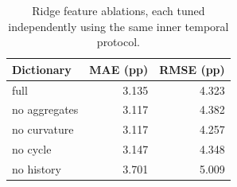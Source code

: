 \begin{table}[H]
\centering
\small
\caption{Ridge feature ablations, each tuned independently using the same inner temporal protocol.}\label{tab:ablations}
\begin{tabular}{lrr}
\toprule
Dictionary & MAE (pp) & RMSE (pp) \\
\midrule
full & 3.135 & 4.323 \\
no aggregates & 3.117 & 4.382 \\
no curvature & 3.117 & 4.257 \\
no cycle & 3.147 & 4.348 \\
no history & 3.701 & 5.009 \\
\bottomrule
\end{tabular}
\end{table}
